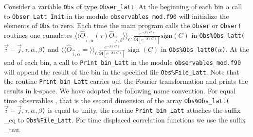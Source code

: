 Consider a variable  \texttt{Obs} of type  \texttt{Obser\_latt}. At the beginning of each bin a call to  \texttt{Obser\_Latt\_Init} in the module \texttt{observables\_mod.f90}  will  initialize  the elements of \texttt{Obs} to zero.    Each time the main program calls the   \texttt{Obser} or  \texttt{ObserT} routines one  cumulates $ \langle \langle \hat{O}_{\vec{i},\alpha} (\tau) \hat{O}_{\vec{j},\beta} \rangle \rangle_{C} \; \frac{e^{-S(C)}} {\Re \left[e^{-S(C)} \right]}  \text{sign}(C) $    in  \texttt{Obs\%Obs\_latt($\vec{i}-\vec{j},\tau,\alpha,\beta$)}   
and $ \langle \langle \hat{O}_{\vec{i},\alpha}= \rangle \rangle_{C}\frac{e^{-S(C)}} {\Re \left[e^{-S(C)} \right]}  \text{ sign }(C) $  in \texttt{Obs\%Obs\_latt0($\alpha$)}.   At the end of each bin, a call to \texttt{Print\_bin\_Latt} in the module  \texttt{observables\_mod.f90}   will append the result of the bin in the specified  file \texttt{Obs\%File\_Latt}.   Note that the routine  \texttt{Print\_bin\_Latt}  carries out the Fourier transformation and prints the results in k-space. We have adopted the following name convention.  For    equal time observables , that is  the second  dimension  of the array  \texttt{Obs\%Obs\_latt($\vec{i}-\vec{j},\tau,\alpha,\beta$)}    is equal to unity,  the routine \texttt{Print\_bin\_Latt}  attaches the suffix \_eq to \texttt{Obs\%File\_Latt}.  For  time displaced correlation functions we use the suffix \_tau. 

